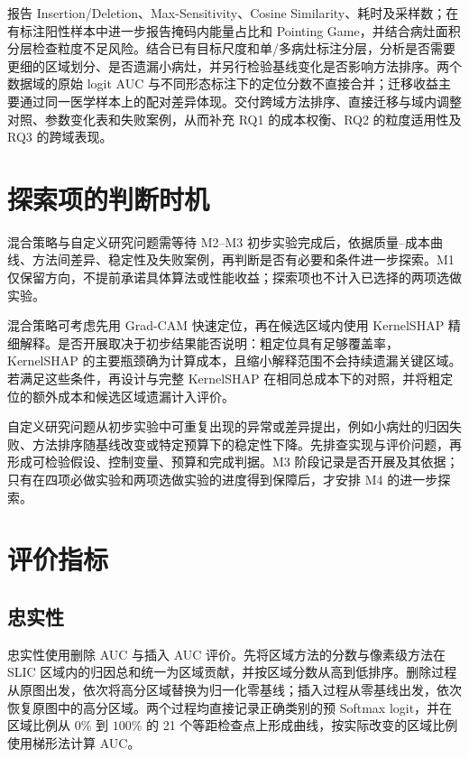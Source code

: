 报告 Insertion/Deletion、Max-Sensitivity、Cosine Similarity、耗时及采样数；在有标注阳性样本中进一步报告掩码内能量占比和 Pointing Game，并结合病灶面积分层检查粒度不足风险。结合已有目标尺度和单/多病灶标注分层，分析是否需要更细的区域划分、是否遗漏小病灶，并另行检验基线变化是否影响方法排序。两个数据域的原始 logit AUC 与不同形态标注下的定位分数不直接合并；迁移收益主要通过同一医学样本上的配对差异体现。交付跨域方法排序、直接迁移与域内调整对照、参数变化表和失败案例，从而补充 RQ1 的成本权衡、RQ2 的粒度适用性及 RQ3 的跨域表现。

\section{探索项的判断时机}

混合策略与自定义研究问题需等待 M2--M3 初步实验完成后，依据质量--成本曲线、方法间差异、稳定性及失败案例，再判断是否有必要和条件进一步探索。M1 仅保留方向，不提前承诺具体算法或性能收益；探索项也不计入已选择的两项选做实验。

混合策略可考虑先用 Grad-CAM 快速定位，再在候选区域内使用 KernelSHAP 精细解释。是否开展取决于初步结果能否说明：粗定位具有足够覆盖率，KernelSHAP 的主要瓶颈确为计算成本，且缩小解释范围不会持续遗漏关键区域。若满足这些条件，再设计与完整 KernelSHAP 在相同总成本下的对照，并将粗定位的额外成本和候选区域遗漏计入评价。

自定义研究问题从初步实验中可重复出现的异常或差异提出，例如小病灶的归因失败、方法排序随基线改变或特定预算下的稳定性下降。先排查实现与评价问题，再形成可检验假设、控制变量、预算和完成判据。M3 阶段记录是否开展及其依据；只有在四项必做实验和两项选做实验的进度得到保障后，才安排 M4 的进一步探索。

\section{评价指标}

\subsection{忠实性}

忠实性使用删除 AUC 与插入 AUC 评价。先将区域方法的分数与像素级方法在 SLIC 区域内的归因总和统一为区域贡献，并按区域分数从高到低排序。删除过程从原图出发，依次将高分区域替换为归一化零基线；插入过程从零基线出发，依次恢复原图中的高分区域。两个过程均直接记录正确类别的预 Softmax logit，并在区域比例从 $0\%$ 到 $100\%$ 的 21 个等距检查点上形成曲线，按实际改变的区域比例使用梯形法计算 AUC。

